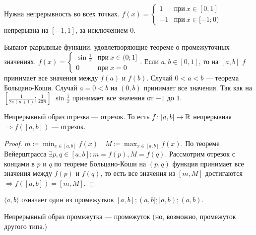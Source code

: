 \begin{remark}
    Нужна непрерывность во всех точках. $f(x) = \begin{cases} 1 & \text{при}\ x \in [0, 1] \\ -1 & \text{при}\ x \in [-1;0) \end{cases}$ непрерывна на $[-1, 1]$, за исключением 0.
\end{remark}
\begin{remark}
    Бывают разрывные функции, удовлетворяющие теореме о промежуточных значениях. $f(x) = \begin{cases} \sin \frac{1}{x} & \text{при}\ x \in (0; 1] \\ 0 & \text{при}\ x = 0\end{cases}$. Если $a, b \in [0, 1]$, то на  $[a, b]$  $f$ принимает все значения между  $f(a)$ и  $f(b)$. Случай  $0 < a < b$ --- теорема Больцано-Коши. Случай  $a=0 < b$ на  $(0, b)$ принимает все значения. Так как на $[\frac{1}{2\pi(n+1)}; \frac{1}{2\pi n}]$ $\sin \frac{1}{x}$  принимает все значения от $-1$ до  $1$.
\end{remark}
\begin{theorem}
    Непрерывный образ отрезка --- отрезок. То есть $f\!: [a, b] \to \mathbb{R}$ непрерывная $\Rightarrow f([a, b])$ --- отрезок. 
\end{theorem}
\begin{proof}
    $\displaystyle m \coloneqq \min_{x \in [a, b]}f(x) \quad M \coloneqq \max_{x \in [a, b]}f(x)$. По теореме Вейерштрасса $\exists p, q \in [a, b]\!: m = f(p), M = f(q)$. Рассмотрим отрезок с концами в $p$ и  $q$ по теореме Больцано-Коши на  $(p, q)$ функция принимает все значения между  $f(p)$ и  $f(q)$, то есть все значения из $[m, M]$ достигаются  $\Rightarrow f([a, b]) = [m, M]$.
\end{proof}
\begin{definition}
    $\langle a, b \rangle$ означает один из промежутков  $[a, b]; (a, b]; [a, b); (a, b)$.
\end{definition}
\begin{theorem}
    Непрерывный образ промежутка --- промежуток (но, возможно, промежуток другого типа.)
\end{theorem}
